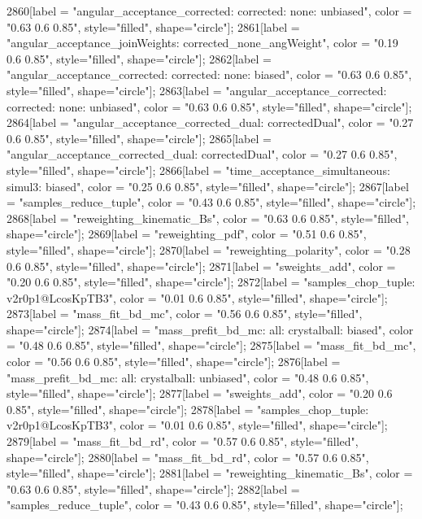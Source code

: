 {	2860[label = "angular_acceptance_corrected\nangacc: corrected\ncsp: none\ntrigger: unbiased", color = "0.63 0.6 0.85", style="filled", shape="circle"];
	2861[label = "angular_acceptance_joinWeights\nwflag: corrected_none_angWeight", color = "0.19 0.6 0.85", style="filled", shape="circle"];
	2862[label = "angular_acceptance_corrected\nangacc: corrected\ncsp: none\ntrigger: biased", color = "0.63 0.6 0.85", style="filled", shape="circle"];
	2863[label = "angular_acceptance_corrected\nangacc: corrected\ncsp: none\ntrigger: unbiased", color = "0.63 0.6 0.85", style="filled", shape="circle"];
	2864[label = "angular_acceptance_corrected_dual\nstep: correctedDual", color = "0.27 0.6 0.85", style="filled", shape="circle"];
	2865[label = "angular_acceptance_corrected_dual\nstep: correctedDual", color = "0.27 0.6 0.85", style="filled", shape="circle"];
	2866[label = "time_acceptance_simultaneous\ntimeacc: simul3\ntrigger: biased", color = "0.25 0.6 0.85", style="filled", shape="circle"];
	2867[label = "samples_reduce_tuple", color = "0.43 0.6 0.85", style="filled", shape="circle"];
	2868[label = "reweighting_kinematic_Bs", color = "0.63 0.6 0.85", style="filled", shape="circle"];
	2869[label = "reweighting_pdf", color = "0.51 0.6 0.85", style="filled", shape="circle"];
	2870[label = "reweighting_polarity", color = "0.28 0.6 0.85", style="filled", shape="circle"];
	2871[label = "sweights_add", color = "0.20 0.6 0.85", style="filled", shape="circle"];
	2872[label = "samples_chop_tuple\nversion: v2r0p1@LcosKpTB3", color = "0.01 0.6 0.85", style="filled", shape="circle"];
	2873[label = "mass_fit_bd_mc", color = "0.56 0.6 0.85", style="filled", shape="circle"];
	2874[label = "mass_prefit_bd_mc\nmassbin: all\nmassmodel: crystalball\ntrigger: biased", color = "0.48 0.6 0.85", style="filled", shape="circle"];
	2875[label = "mass_fit_bd_mc", color = "0.56 0.6 0.85", style="filled", shape="circle"];
	2876[label = "mass_prefit_bd_mc\nmassbin: all\nmassmodel: crystalball\ntrigger: unbiased", color = "0.48 0.6 0.85", style="filled", shape="circle"];
	2877[label = "sweights_add", color = "0.20 0.6 0.85", style="filled", shape="circle"];
	2878[label = "samples_chop_tuple\nversion: v2r0p1@LcosKpTB3", color = "0.01 0.6 0.85", style="filled", shape="circle"];
	2879[label = "mass_fit_bd_rd", color = "0.57 0.6 0.85", style="filled", shape="circle"];
	2880[label = "mass_fit_bd_rd", color = "0.57 0.6 0.85", style="filled", shape="circle"];
	2881[label = "reweighting_kinematic_Bs", color = "0.63 0.6 0.85", style="filled", shape="circle"];
	2882[label = "samples_reduce_tuple", color = "0.43 0.6 0.85", style="filled", shape="circle"];
}

